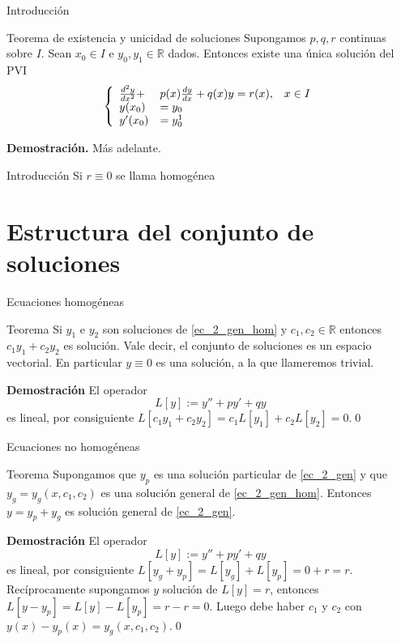 \documentclass[handout,hyperref={colorlinks=true}]{beamer}
\newcommand{\rr}{\mathbb{R}}
\renewcommand{\emph}[1]{\textcolor[rgb]{1,0,0}{#1}}
\newcommand{\nl}{\onslide<+-> }
\begin{document}
\begin{frame}{Introducción}
\nl \begin{block}{Teorema de existencia y unicidad de soluciones}
 Supongamos $p,q,r$ continuas sobre $I$. Sean $x_0\in I$ e $y_0,y_1\in\rr$ dados. Entonces existe una única solución del PVI
 \[\left\{
 \begin{array}{l l l}
   \frac{d^2y}{dx^2}+&p(x)\frac{dy}{dx}+q(x)y=r(x),&x\in I\\
   y(x_0)&=y_0&\\
   y'(x_0)&=y^1_0&\\ 
  \end{array}\right.
\]


\end{block}
\nl \textbf{Demostración.} Más adelante.
\end{frame}


\begin{frame}{Introducción}
Si $r\equiv 0$ se llama homogénea
\end{frame}


\section{Estructura del conjunto de soluciones}

\begin{frame}{Ecuaciones homogéneas}
\nl\begin{block}{Teorema}
 Si $y_1$ e $y_2$ son soluciones de \eqref{ec_2_gen_hom} y $c_1,c_2\in\rr$ entonces $c_1y_1+c_2y_2$ es solución. Vale decir, el conjunto de soluciones 
 es un espacio vectorial. En particular $y\equiv 0$ es una solución, a la que llameremos \emph{trivial}.

 

\end{block}

\nl\textbf{Demostración} 
 El operador 
 \[L[y]:=y''+py'+qy\]
es lineal, por consiguiente
$L[c_1y_1+c_2y_2]=c_1L[y_1]+c_2L[y_2]=0.$\qed
\end{frame}



\begin{frame}{Ecuaciones no homogéneas}
\nl\begin{block}{Teorema}
 Supongamos que $y_p$ es una solución particular de \eqref{ec_2_gen} y que $y_g=y_g(x,c_1,c_2)$ es una solución
 general de \eqref{ec_2_gen_hom}. Entonces $y=y_p+y_g$ es solución general de \eqref{ec_2_gen}.
\end{block}

\nl\textbf{Demostración} 
 El operador 
 \[L[y]:=y''+py'+qy\]
es lineal, por consiguiente
$L[y_g+y_p]=L[y_g]+L[y_p]=0+r=r.$
Recíprocamente supongamos $y$ solución de $L[y]=r$, entonces
$L[y-y_p]=L[y]-L[y_p]=r-r=0.$
Luego debe haber $c_1$ y $c_2$ con $y(x)-y_p(x)=y_g(x,c_1,c_2)$.\qed 
 
\end{frame}
\end{document}
